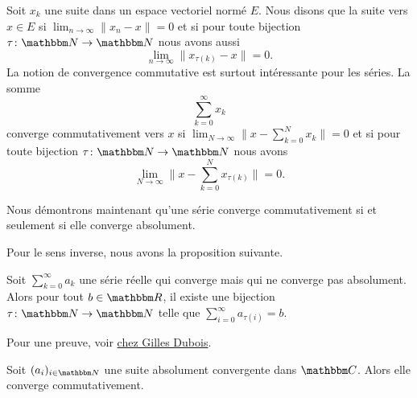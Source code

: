 \begin{definition}
    Soit \( x_k\) une suite dans un espace vectoriel normé \( E\). Nous disons que la suite  vers \( x\in E\) si \( \lim_{n\to \infty}\| x_n-x \| =0\) et si pour toute bijection \( \tau\colon \eN\to \eN\) nous avons aussi
    \begin{equation}
        \lim_{n\to \infty} \| x_{\tau(k)}-x \|=0.
    \end{equation}
    La notion de convergence commutative est surtout intéressante pour les séries. La somme
    \begin{equation}
        \sum_{k=0}^{\infty}x_k
    \end{equation}
    converge commutativement vers \( x\) si \( \lim_{N\to \infty} \| x-\sum_{k=0}^Nx_k \|=0\) et si pour toute bijection \( \tau\colon \eN\to \eN\) nous avons
    \begin{equation}
        \lim_{N\to \infty} \| x-\sum_{k=0}^Nx_{\tau(k)} \|=0.
    \end{equation}
\end{definition}

Nous démontrons maintenant qu'une série converge commutativement si et seulement si elle converge absolument.

Pour le sens inverse, nous avons la proposition suivante.
\begin{proposition}
    Soit \( \sum_{k=0}^{\infty}a_k\) une série réelle qui converge mais qui ne converge pas absolument. Alors pour tout \( b\in \eR\), il existe une bijection \( \tau\colon \eN\to \eN\) telle que \( \sum_{i=0}^{\infty}a_{\tau(i)}=b\).
\end{proposition}
Pour une preuve, voir \href{http://gilles.dubois10.free.fr/analyse_reelle/seriescomconv.html}{chez Gilles Dubois}.

\begin{proposition} \label{PopriXWvIY}
    Soit \( (a_i)_{i\in \eN}\) une suite absolument convergente dans \( \eC\). Alors elle converge commutativement.
\end{proposition}

